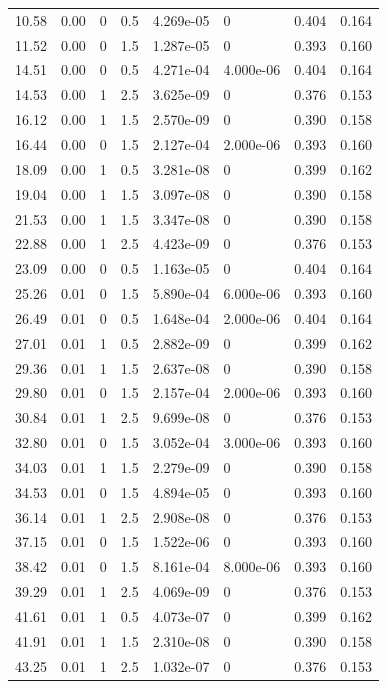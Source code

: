\documentclass[preview]{standalone}
\begin{document}
{{\begin{tabular}{L{1.2cm}C{1.2cm} C{0.3cm}C{0.5cm} C{1.4cm}C{1.4cm} C{1.4cm}C{1.4cm}}
  10.58  &  0.00  & 0     & 0.5 &  4.269e-05  & 0  & 0.404 &  0.164   \\ 
  11.52  &  0.00  & 0     & 1.5 &  1.287e-05  & 0  & 0.393 &  0.160   \\ 
  14.51  &  0.00  & 0     & 0.5 &  4.271e-04  & 4.000e-06  & 0.404 &  0.164   \\ 
  14.53  &  0.00  & 1     & 2.5 &  3.625e-09  & 0  & 0.376 &  0.153   \\ 
  16.12  &  0.00  & 1     & 1.5 &  2.570e-09  & 0  & 0.390 &  0.158   \\ 
  16.44  &  0.00  & 0     & 1.5 &  2.127e-04  & 2.000e-06  & 0.393 &  0.160   \\ 
  18.09  &  0.00  & 1     & 0.5 &  3.281e-08  & 0  & 0.399 &  0.162   \\ 
  19.04  &  0.00  & 1     & 1.5 &  3.097e-08  & 0  & 0.390 &  0.158   \\ 
  21.53  &  0.00  & 1     & 1.5 &  3.347e-08  & 0  & 0.390 &  0.158   \\ 
  22.88  &  0.00  & 1     & 2.5 &  4.423e-09  & 0  & 0.376 &  0.153   \\ 
  23.09  &  0.00  & 0     & 0.5 &  1.163e-05  & 0  & 0.404 &  0.164   \\ 
  25.26  &  0.01  & 0     & 1.5 &  5.890e-04  & 6.000e-06  & 0.393 &  0.160   \\ 
  26.49  &  0.01  & 0     & 0.5 &  1.648e-04  & 2.000e-06  & 0.404 &  0.164   \\ 
  27.01  &  0.01  & 1     & 0.5 &  2.882e-09  & 0  & 0.399 &  0.162   \\ 
  29.36  &  0.01  & 1     & 1.5 &  2.637e-08  & 0  & 0.390 &  0.158   \\ 
  29.80  &  0.01  & 0     & 1.5 &  2.157e-04  & 2.000e-06  & 0.393 &  0.160   \\ 
  30.84  &  0.01  & 1     & 2.5 &  9.699e-08  & 0  & 0.376 &  0.153   \\ 
  32.80  &  0.01  & 0     & 1.5 &  3.052e-04  & 3.000e-06  & 0.393 &  0.160   \\ 
  34.03  &  0.01  & 1     & 1.5 &  2.279e-09  & 0  & 0.390 &  0.158   \\ 
  34.53  &  0.01  & 0     & 1.5 &  4.894e-05  & 0  & 0.393 &  0.160   \\ 
  36.14  &  0.01  & 1     & 2.5 &  2.908e-08  & 0  & 0.376 &  0.153   \\ 
  37.15  &  0.01  & 0     & 1.5 &  1.522e-06  & 0  & 0.393 &  0.160   \\ 
  38.42  &  0.01  & 0     & 1.5 &  8.161e-04  & 8.000e-06  & 0.393 &  0.160   \\ 
  39.29  &  0.01  & 1     & 2.5 &  4.069e-09  & 0  & 0.376 &  0.153   \\ 
  41.61  &  0.01  & 1     & 0.5 &  4.073e-07  & 0  & 0.399 &  0.162   \\ 
  41.91  &  0.01  & 1     & 1.5 &  2.310e-08  & 0  & 0.390 &  0.158   \\ 
  43.25  &  0.01  & 1     & 2.5 &  1.032e-07  & 0  & 0.376 &  0.153   \\ 
\hline 
\end{tabular} 

}}
\end{document}
